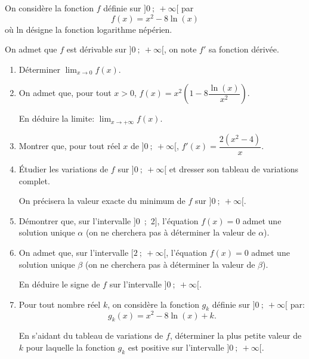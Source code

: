 \medskip

On considère la fonction $f$ définie sur $]0~;~+\infty[$ par
\[f(x) = x^2 - 8\ln (x)\]
où ln désigne la fonction logarithme népérien.

On admet que $f$ est dérivable sur $]0~;~+\infty[$, on note $f'$ sa fonction dérivée. 

\medskip

\begin{enumerate}
\item Déterminer $\displaystyle\lim_{x \to 0} f(x)$.
\item On admet que, pour tout $x > 0$,\: $f(x) = x^2\left(1 - 8\dfrac{\ln (x)}{x^2}\right)$.

En déduire la limite: $\displaystyle\lim_{x \to + \infty} f(x)$.
\item Montrer que, pour tout réel $x$ de $]0~;~+\infty[$, $f'(x) = \dfrac{2\left(x^2 - 4\right)}{x}$.
\item Étudier les variations de $f$ sur $]0~;~+\infty[$ et dresser son tableau de variations complet.

On précisera la valeur exacte du minimum de $f$ sur $]0~;~+\infty[$.
\item Démontrer que, sur l'intervalle ]0~;~2], l'équation $f(x) = 0$ admet une solution
unique $\alpha$ (on ne cherchera pas à déterminer la valeur de $\alpha$).
\item On admet que, sur l'intervalle $[2~;~ +\infty[$, l'équation $f(x) = 0$ admet une solution unique $\beta$ (on ne cherchera pas à déterminer la valeur de $\beta$).

En déduire le signe de $f$ sur l'intervalle $]0~;~+\infty[$.
\item Pour tout nombre réel $k$, on considère la fonction $g_k$ définie sur $]0~;~+\infty[$ par:
\[g_k(x) = x^2 - 8\ln (x) + k.\]

En s'aidant du tableau de variations de $f$, déterminer la plus petite valeur de $k$
pour laquelle la fonction $g_k$ est positive sur l'intervalle $]0~;~+\infty[$.
\end{enumerate}

\bigskip
